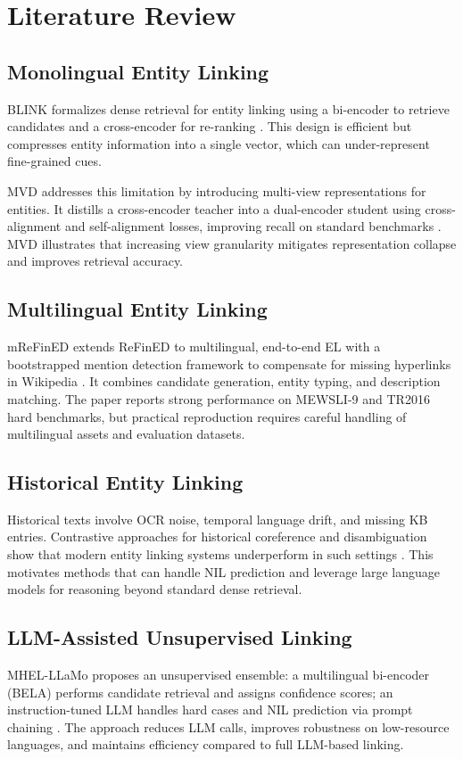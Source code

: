\chapter{Literature Review}
\label{ch:literature}

\section{Monolingual Entity Linking}
BLINK formalizes dense retrieval for entity linking using a bi-encoder to retrieve candidates and a cross-encoder for re-ranking \cite{wu2020blink}. This design is efficient but compresses entity information into a single vector, which can under-represent fine-grained cues.

MVD addresses this limitation by introducing multi-view representations for entities. It distills a cross-encoder teacher into a dual-encoder student using cross-alignment and self-alignment losses, improving recall on standard benchmarks \cite{mvd2023}. MVD illustrates that increasing view granularity mitigates representation collapse and improves retrieval accuracy.

\section{Multilingual Entity Linking}
mReFinED extends ReFinED to multilingual, end-to-end EL with a bootstrapped mention detection framework to compensate for missing hyperlinks in Wikipedia \cite{mrefined2023}. It combines candidate generation, entity typing, and description matching. The paper reports strong performance on MEWSLI-9 and TR2016 hard benchmarks, but practical reproduction requires careful handling of multilingual assets and evaluation datasets.

\section{Historical Entity Linking}
Historical texts involve OCR noise, temporal language drift, and missing KB entries. Contrastive approaches for historical coreference and disambiguation show that modern entity linking systems underperform in such settings \cite{arora2024}. This motivates methods that can handle NIL prediction and leverage large language models for reasoning beyond standard dense retrieval.

\section{LLM-Assisted Unsupervised Linking}
MHEL-LLaMo proposes an unsupervised ensemble: a multilingual bi-encoder (BELA) performs candidate retrieval and assigns confidence scores; an instruction-tuned LLM handles hard cases and NIL prediction via prompt chaining \cite{mhelllamo2026}. The approach reduces LLM calls, improves robustness on low-resource languages, and maintains efficiency compared to full LLM-based linking.
